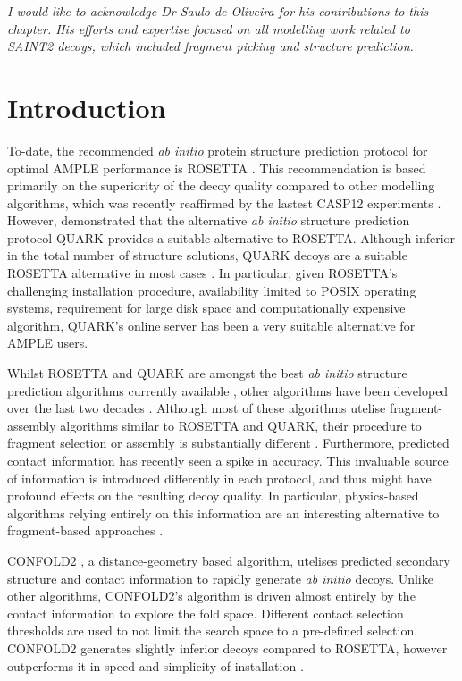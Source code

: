 \textit{I would like to acknowledge Dr Saulo de Oliveira for his contributions to this chapter. His efforts and expertise focused on all modelling work related to SAINT2 decoys, which included fragment picking and structure prediction.}

\section{Introduction}
To-date, the recommended \textit{ab initio} protein structure prediction protocol for optimal AMPLE performance is ROSETTA \cite{Keegan2015-zb, Thomas2017-sh, Thomas2015-wu, Bibby2012-lm}. This recommendation is based primarily on the superiority of the decoy quality compared to other modelling algorithms, which was recently reaffirmed by the lastest CASP12 experiments \cite{Abriata2018-lu,Ovchinnikov2017-wp}. However, \textcite{Keegan2015-zb} demonstrated that the alternative \textit{ab initio} structure prediction protocol QUARK provides a suitable alternative to ROSETTA. Although inferior in the total number of structure solutions, QUARK decoys are a suitable ROSETTA alternative in most cases \cite{Keegan2015-zb}. In particular, given ROSETTA's challenging installation procedure, availability limited to POSIX operating systems, requirement for large disk space and computationally expensive algorithm, QUARK's online server has been a very suitable alternative for AMPLE users.

Whilst ROSETTA and QUARK are amongst the best \textit{ab initio} structure prediction algorithms currently available \cite{Abriata2018-lu}, other algorithms have been developed over the last two decades \cite[e.g.,][]{Jones2001-mc,Ellis2010-zs,Adhikari2015-lb,Xu2012-jf,Marks2011-os,Wang2016-ar}. Although most of these algorithms utelise fragment-assembly algorithms similar to ROSETTA and QUARK, their procedure to fragment selection or assembly is substantially different \cite{Ellis2010-zs,Jones2001-mc}. Furthermore, predicted contact information has recently seen a spike in accuracy. This invaluable source of information is introduced differently in each protocol, and thus might have profound effects on the resulting decoy quality. In particular, physics-based algorithms relying entirely on this information are an interesting alternative to fragment-based approaches \cite{Adhikari2015-lb,Marks2011-os,Wang2016-ar}.

CONFOLD2 \cite{Adhikari2018-lj}, a distance-geometry based algorithm, utelises predicted secondary structure and contact information to rapidly generate \textit{ab initio} decoys. Unlike other algorithms, CONFOLD2's algorithm is driven almost entirely by the contact information to explore the fold space. Different contact selection thresholds are used to not limit the search space to a pre-defined selection. CONFOLD2 generates slightly inferior decoys compared to ROSETTA, however outperforms it in speed and simplicity of installation \cite{Adhikari2018-lj,Michel2017-xh}.

